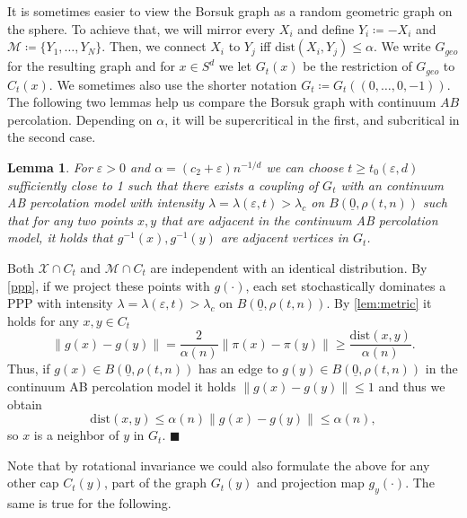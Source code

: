 \documentclass[11pt]{article}%
\newenvironment{proof}{\vspace{1ex}\noindent{\bf Proof.}}{\hspace*{\fill}$\blacksquare$\vspace{1ex}}
\newtheorem{lemma}[lemma]{Lemma}
\newcommand{\norm}[1]{\ensuremath{\left\|#1\right\|}}
\newcommand{\eps}{\varepsilon}
\newcommand{\dists}{{\mathrm{dist}}}
\newcommand{\typ}{\underline{0}}
\begin{document}
\noindent
It is sometimes easier to view the Borsuk graph as a random geometric graph on the sphere. 
To achieve that, we will mirror every $ X_i $ and define $ Y_{i}\coloneqq -X_{i} $ and 
$ \mathcal{M}\coloneqq\{Y_1,\dots,Y_N\} $. Then, we connect $ X_i $ to $ Y_j $ iff $ \dists(X_i,Y_j)\leq \alpha $.
We write $ G_{geo} $ for the resulting graph and for $ x\in S^d $ we let $ G_t(x) $ be the restriction of $ G_{geo} $ 
to $ C_t(x) $. We sometimes also use the shorter 
notation $ G_t\coloneqq G_t((0,\dots,0,-1)) $. The following two lemmas help us compare the Borsuk graph with 
continuum $AB$ percolation. Depending on $\alpha$, it will be supercritical in the first, and subcritical in the second case.

\begin{lemma}\label{coupleab}
	For $ \eps>0 $ and $\alpha=(c_2+\eps)n^{-1/d}$ we can choose $t\geq t_0(\eps,d)$ sufficiently close to 1 such that there exists a coupling of $ G_t $ with an continuum AB percolation model with intensity $ \lambda=\lambda(\eps,t)>\lambda_c$ on $ B(\typ,\rho(t,n)) $ such that for any two points $ x,y $ that are adjacent in the continuum AB percolation model, it holds that $ g^{-1}(x),g^{-1}(y) $ are adjacent vertices in $ G_t $.
\end{lemma}
\begin{proof}
	Both $ \mathcal{X}\cap C_t $ and $ \mathcal{M}\cap C_t $ are independent with an identical distribution. By \cref{ppp}, if we project these points with $ g(\cdot) $, each set stochastically dominates a PPP with intensity $ \lambda=\lambda(\eps,t)>\lambda_c$ on $ B(\typ,\rho(t,n)) $. By \cref{lem:metric} it holds for any $ x,y\in C_t $
	\begin{equation*}
		\norm{g(x)-g(y)} = \frac{2}{\alpha(n)}\norm{\pi(x)-\pi(y)}\geq \frac{\dists(x,y)}{\alpha(n)}.
	\end{equation*}
	Thus, if $ g(x)\in B(\typ,\rho(t,n)) $ has an edge to $ g(y)\in B(\typ,\rho(t,n)) $ in the continuum AB percolation model it holds $\norm{g(x)-g(y)}\leq 1$ and thus we obtain
	\begin{equation*}
		\dists(x,y)\leq \alpha(n)\norm{g(x)-g(y)}\leq \alpha(n),
	\end{equation*}
	 so $ x $ is a neighbor of $ y $ in $ G_t $.
\end{proof}

\noindent
Note that by rotational invariance we could also formulate the above for any other cap $ C_t(y)$, part of the 
graph $ G_t(y) $ and projection map $ g_y(\cdot) $. The same is true for the following.
\end{document}
